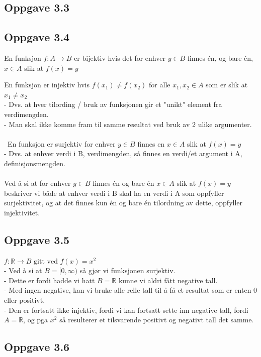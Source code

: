 \documentclass{article}
\begin{document}
\newpage

\subsection*{Oppgave 3.3}

\subsection*{Oppgave 3.4}
En funksjon $f : A \rightarrow B$ er bijektiv hvis det for enhver $y \in B$ finnes én, og bare én, $x \in A$ slik at $f(x) = y$

En funksjon er injektiv hvis $f(x_1) \neq f(x_2)$ for alle $x_1, x_2 \in A$ som er slik at $x_1 \neq x_2$
\\ - Dvs. at hver tilording / bruk av funksjonen gir et "unikt" element fra verdimengden. 
\\ - Man skal ikke komme fram til samme resultat ved bruk av 2 ulike argumenter.
\\ \\\
En funksjon er surjektiv for enhver $y \in B$ finnes en $x \in A$ slik at $f(x) = y$
\\ - Dvs. at enhver verdi i B, verdimengden, så finnes en verdi/et argument i A, definisjonsmengden.
\\ \\
Ved å si at for enhver $y \in B$ finnes én og bare én $x \in A$ slik at $f(x) = y$ beskriver vi både at enhver verdi i B skal ha en verdi i A som oppfyller surjektivitet, og at det finnes kun én og bare én tilordning av dette, oppfyller injektivitet.

\subsection*{Oppgave 3.5}
\(f : \mathbb{R} \rightarrow B \text{ gitt ved } f(x) = x^2\)
\\ - Ved å si at $B = [0, \infty)$ så gjør vi funksjonen surjektiv. 
\\ - Dette er fordi hadde vi hatt $B = \mathbb{R}$ kunne vi aldri fått negative tall. 
\\ - Med ingen negative, kan vi bruke alle relle tall til å få et resultat som er enten 0 eller positivt.
\\ - Den er fortsatt ikke injektiv, fordi vi kan fortsatt sette inn negative tall, fordi $A = \mathbb{R}$, og pga $x^2$ så resulterer et tilsvarende positivt og negativt tall det samme.

\subsection*{Oppgave 3.6}
\end{document}
